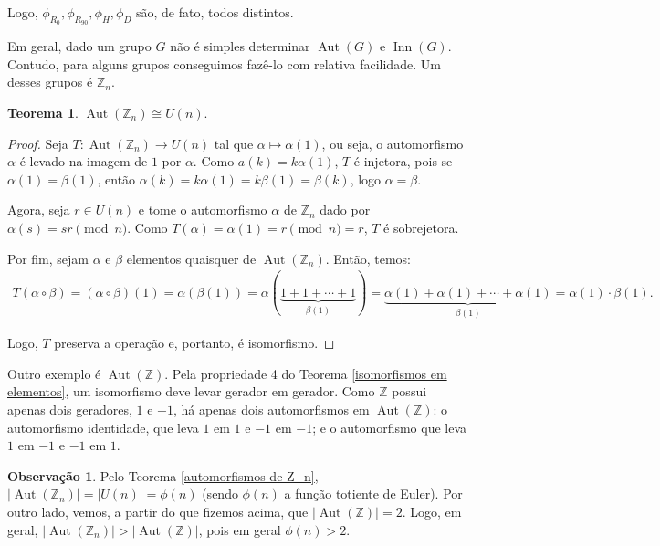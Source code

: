\documentclass[a4paper,portuguese,11pt,twoside, leqno]{book}
\DeclareMathOperator{\aut}{Aut}
\DeclareMathOperator{\inn}{Inn}
\theoremstyle{definition}
\newtheorem{theorem}{Teorema}[section]
\newtheorem{remark}{Observação}[section]
\begin{document}
	\par\vspace{0.3cm} Logo, $\phi_{R_0}, \phi_{R_{90}}, \phi_{H}, \phi_{D}$ são, de fato, todos distintos. 
	\par\vspace{0.3cm} Em geral, dado um grupo $G$ não é simples determinar $\aut(G)$ e $\inn(G)$. Contudo, para alguns grupos conseguimos fazê-lo com relativa facilidade. Um desses grupos é $\mathbb{Z}_n$.
	\begin{theorem}
		\label{automorfismos de Z_n}
		$\aut(\mathbb{Z}_n) \cong U(n)$.
	\end{theorem}
	
	\begin{proof}
		Seja $T: \aut(\mathbb{Z}_n)\to U(n)$ tal que $\alpha\mapsto\alpha(1)$, ou seja, o automorfismo $\alpha$ é levado na imagem de $1$ por $\alpha$. Como $a(k) = k\alpha(1)$, $T$ é injetora, pois se $\alpha(1) = \beta(1)$, então $\alpha(k) = k\alpha(1) = k\beta(1) = \beta(k)$, logo $\alpha = \beta$. 
		\par\vspace{0.3cm} Agora, seja $r\in U(n)$ e tome o automorfismo $\alpha$ de $\mathbb{Z}_n$ dado por $\alpha(s) = sr \pmod n$. Como $T(\alpha) = \alpha(1) = r\pmod n = r$, $T$ é sobrejetora.
		\par\vspace{0.3cm} Por fim, sejam $\alpha$ e $\beta$ elementos quaisquer de $\aut(\mathbb{Z}_n)$. Então, temos:
		\begin{align*}
		T(\alpha\circ\beta) = (\alpha\circ\beta)(1) = \alpha(\beta(1)) = \alpha(\underbrace{1 + 1 + \cdots + 1}_{\beta(1)}) = \underbrace{\alpha(1) + \alpha(1) + \cdots + \alpha(1)}_{\beta(1)} = \alpha(1)\cdot\beta(1).
		\end{align*}
		\par\vspace{0.3cm} Logo, $T$ preserva a operação e, portanto, é isomorfismo.
	\end{proof}
	\par\vspace{0.3cm} Outro exemplo é $\aut(\mathbb{Z})$.	Pela propriedade 4 do Teorema \eqref{isomorfismos em elementos}, um isomorfismo deve levar gerador em gerador. Como $\mathbb{Z}$ possui apenas dois geradores, $1$ e $-1$, há apenas dois automorfismos em $\aut(\mathbb{Z})$: o automorfismo identidade, que leva $1$ em $1$ e $-1$ em $-1$; e o automorfismo que leva $1$ em $-1$ e $-1$ em $1$.
	
	
	\begin{remark}
		Pelo Teorema \eqref{automorfismos de Z_n}, $|\aut(\mathbb{Z}_n)| = |U(n)| = \phi(n)$ (sendo $\phi(n)$ a função totiente de Euler). Por outro lado, vemos, a partir do que fizemos acima, que $|\aut(\mathbb{Z})| = 2$. Logo, em geral, $|\aut(\mathbb{Z}_n)| > |\aut(\mathbb{Z})|$, pois em geral $\phi(n) > 2$.
	\end{remark}
	
\end{document}
